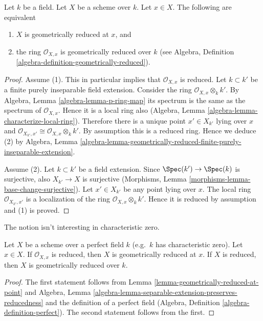 \begin{lemma}
\label{lemma-geometrically-reduced-at-point}
Let $k$ be a field.
Let $X$ be a scheme over $k$.
Let $x \in X$.
The following are equivalent
\begin{enumerate}
\item $X$ is geometrically reduced at $x$, and
\item the ring $\mathcal{O}_{X, x}$ is geometrically
reduced over $k$ (see
Algebra, Definition \ref{algebra-definition-geometrically-reduced}).
\end{enumerate}
\end{lemma}

\begin{proof}
Assume (1). This in particular implies that $\mathcal{O}_{X, x}$
is reduced. Let $k \subset k'$ be a finite purely inseparable field
extension. Consider the ring $\mathcal{O}_{X, x} \otimes_k k'$.
By Algebra, Lemma \ref{algebra-lemma-p-ring-map}
its spectrum is the same as the spectrum of $\mathcal{O}_{X, x}$.
Hence it is a local ring also
(Algebra, Lemma \ref{algebra-lemma-characterize-local-ring}).
Therefore there is a unique point $x' \in X_{k'}$ lying over $x$
and $\mathcal{O}_{X_{k'}, x'} \cong \mathcal{O}_{X, x} \otimes_k k'$.
By assumption this is a reduced ring. Hence we deduce (2) by
Algebra, Lemma
\ref{algebra-lemma-geometrically-reduced-finite-purely-inseparable-extension}.

\medskip\noindent
Assume (2). Let $k \subset k'$ be a field extension. Since
$\Spec(k') \to \Spec(k)$ is surjective, also
$X_{k'} \to X$ is surjective
(Morphisms, Lemma \ref{morphisms-lemma-base-change-surjective}).
Let $x' \in X_{k'}$ be any point lying over $x$.
The local ring $\mathcal{O}_{X_{k'}, x'}$
is a localization of the ring $\mathcal{O}_{X, x} \otimes_k k'$.
Hence it is reduced by assumption and (1) is proved.
\end{proof}

\noindent
The notion isn't interesting in characteristic zero.

\begin{lemma}
\label{lemma-perfect-reduced}
Let $X$ be a scheme over a perfect field $k$ (e.g.\ $k$ has
characteristic zero). Let $x \in X$. If $\mathcal{O}_{X, x}$ is
reduced, then $X$ is geometrically reduced at $x$.
If $X$ is reduced, then $X$ is geometrically reduced over $k$.
\end{lemma}

\begin{proof}
The first statement follows from
Lemma \ref{lemma-geometrically-reduced-at-point} and
Algebra, Lemma \ref{algebra-lemma-separable-extension-preserves-reducedness}
and the definition of a perfect field
(Algebra, Definition \ref{algebra-definition-perfect}).
The second statement follows from the first.
\end{proof}

